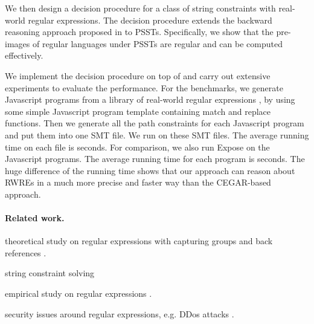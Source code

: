 We then design a decision procedure for a class of string constraints with real-world regular expressions. The decision procedure extends the backward reasoning approach proposed in \cite{CHL+19} to PSSTs. Specifically, we show that the pre-images of regular languages under PSSTs are regular and can be computed effectively. 

We implement the decision procedure on top of {\ostrich} and carry out extensive experiments to evaluate the performance. For the benchmarks, we generate  Javascript programs from a library of real-world regular expressions \cite{DMC+19}, by using some simple Javascript program template containing match and replace functions.  Then we generate all the path constraints for each Javascript program and put them into one SMT file. We run {\ostrich} on these SMT files. The average running time on each file is  seconds. For comparison, we also run Expose on the Javascript programs. The average running time for each program is  seconds. The huge difference of the running time shows that our approach can reason about RWREs in a much more precise and faster way than the CEGAR-based approach.


\paragraph*{Related work.}

theoretical study on regular expressions with capturing groups and back references \cite{CSY03,CN09,Freydenberger13,Schmid16,FS19}.

string constraint solving
\cite{ZAM19}


empirical study on regular expressions \cite{MDD+19}.

security issues around regular expressions, e.g. DDos attacks \cite{SP18,DCSL18}.

